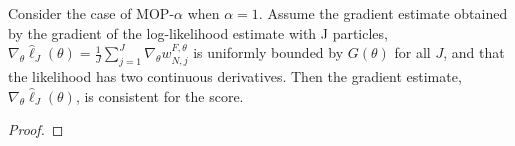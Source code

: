 \documentclass{article}
\begin{document}
\begin{lem}
    Consider the case of MOP-$\alpha$ when $\alpha=1$. Assume the gradient estimate obtained by the gradient of the log-likelihood estimate with J particles, $\nabla_\theta \hat\ell_J(\theta) = \frac{1}{J}\sum_{j=1}^J \nabla_\theta w_{N,j}^{F,\theta}$ is uniformly bounded by $G(\theta)$ for all $J$, and that the likelihood has two continuous derivatives. Then the gradient estimate, $\nabla_\theta \hat\ell_J(\theta)$, is consistent for the score.
    \label{lem:mop-grad-consistency}
\end{lem}
\begin{proof}




    

\end{proof}
\end{document}
